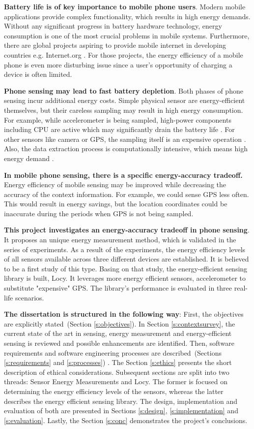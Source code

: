 \textbf{Battery life is of key importance to mobile phone users}. Modern mobile applications provide complex functionality, which results in high energy demands. Without any significant progress in battery hardware technology, energy consumption is one of the most crucial problems in mobile systems. Furthermore, there are global projects aspiring to provide mobile internet in developing countries e.g. Internet.org \cite{facebook:internetorg}. For those projects, the energy efficiency of a mobile phone is even more disturbing issue since a user's opportunity of charging a device is often limited.

\textbf{Phone sensing may lead to fast battery depletion}. Both phases of phone sensing incur additional energy costs. Simple physical sensor are energy-efficient themselves, but their careless sampling may result in high energy consumption. For example, while accelerometer is being sampled, high-power components including CPU are active which may significantly drain the battery life \cite{priyantha:littlerock}. For other sensors like camera or GPS, the sampling itself is an expensive operation \cite{benabdesslem:senseless}. Also, the data extraction process is computationally intensive, which means high energy demand \cite{musolesi:offloading}.

\textbf{In mobile phone sensing, there is a specific energy-accuracy tradeoff.} Energy efficiency of mobile sensing may be improved while decreasing the accuracy of the context information. For example, we could sense GPS less often. This would result in energy savings, but the location coordinates could be inaccurate during the periods when GPS is not being sampled.

\textbf{This project investigates an energy-accuracy tradeoff in phone sensing}. It proposes an unique energy measurement method, which is validated in the series of experiments. As a result of the experiments, the energy efficiency levels of all sensors available across three different devices are established. It is believed to be a first study of this type. Basing on that study, the energy-efficient sensing library is built, Locy. It leverages more energy efficient sensors, accelerometer to substitute "expensive" GPS. The library's performance is evaluated in three real-life scenarios. 

\textbf{The dissertation is structured in the following way}: First, the objectives are explicitly stated\ (Section \ref{s:objectives}). In Section \ref{s:contextsurvey}, the current state of the art in sensing, energy measurement and energy-efficient sensing is reviewed and possible enhancements are identified. Then, software requirements and software engineering processes are described\ (Sections \ref{s:requirements} and \ref{s:processes}) . The Section \ref{s:ethics} presents the short description of ethical considerations. Subsequent sections are split into two threads: Sensor Energy Measurements and Locy. The former is focused on determining the energy efficiency levels of the sensors, whereas the latter describes the energy efficient sensing library. The design, implementation and evaluation of both are presented in Sections \ref{s:design}, \ref{s:implementation} and \ref{s:evaluation}. Lastly, the Section \ref{s:conc} demonstrates the project's conclusions.
